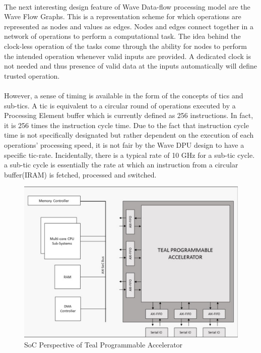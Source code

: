 \paragraph{}
The next interesting design feature of Wave Data-flow processing model are the Wave Flow Graphs. This is a representation scheme for which operations are represented as nodes and values as edges. Nodes and edges connect together in a network of operations to perform a computational task. The idea behind the clock-less operation of the tasks come through the ability for nodes to perform the intended operation whenever valid inputs are provided. A dedicated clock is not needed and thus presence of valid data at the inputs automatically will define trusted operation. 

\paragraph{}
However, a sense of timing is available in the form of the concepts of tics and sub-tics. A tic is equivalent to a circular round of operations executed by a Processing Element buffer which is currently defined as 256 instructions. In fact, it is 256 times the instruction cycle time. Due to the fact that instruction cycle time is not specifically designated but rather dependent on the execution of each operations’ processing speed, it is not fair by the Wave DPU design to have a specific tic-rate. Incidentally, there is a typical rate of 10 GHz for a sub-tic cycle. a sub-tic cycle is essentially the rate at which an instruction from a circular buffer(IRAM) is fetched, processed and switched. 

\begin{figure}[H]
    \centering
    \includegraphics[trim=0cm 0cm 0cm 0cm, clip=true,scale=0.5]{figures/soc_pers.jpg}
    \caption{SoC Perspective of Teal Programmable Accelerator\label{Fig:socpers}}\vspace{-4mm}
    \end{figure}


